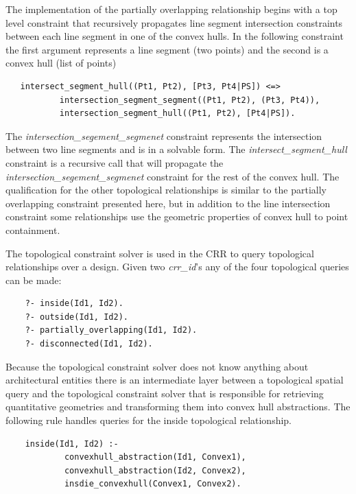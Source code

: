 \documentclass[12pt]{ucthesis}
\begin{document}
The implementation of the partially overlapping relationship begins with a top level constraint that recursively propagates line segment intersection constraints between each line segment in one of the convex hulls. In the following constraint the first argument represents a line segment (two points) and the second is a convex hull (list of points)
\begin{verbatim}
   intersect_segment_hull((Pt1, Pt2), [Pt3, Pt4|PS]) <=>
           intersection_segment_segment((Pt1, Pt2), (Pt3, Pt4)),
           intersection_segment_hull((Pt1, Pt2), [Pt4|PS]).
\end{verbatim} The \emph{intersection\_segement\_segmenet} constraint represents the intersection between two line segments and is in a solvable form. The \emph{intersect\_segment\_hull} constraint is a recursive call that will propagate the \emph{intersection\_segement\_segmenet} constraint for the rest of the convex hull. The qualification for the other topological relationships is similar to the partially overlapping constraint presented here, but in addition to the line intersection constraint some relationships use the geometric properties of convex hull to point containment.



The topological constraint solver is used in the CRR to query topological relationships over a design. Given two \emph{crr\_id}'s any of the four topological queries can be made: 
\begin{verbatim}
    ?- inside(Id1, Id2).
    ?- outside(Id1, Id2).
    ?- partially_overlapping(Id1, Id2).
    ?- disconnected(Id1, Id2).
\end{verbatim}Because the topological constraint solver does not know anything about architectural entities there is an intermediate layer between a topological spatial query and the topological constraint solver that is responsible for retrieving quantitative geometries and transforming them into convex hull abstractions. The following rule handles queries for the inside topological relationship.
\begin{verbatim}
    inside(Id1, Id2) :-
            convexhull_abstraction(Id1, Convex1),
            convexhull_abstraction(Id2, Convex2),
            insdie_convexhull(Convex1, Convex2).
\end{verbatim}
\end{document}
